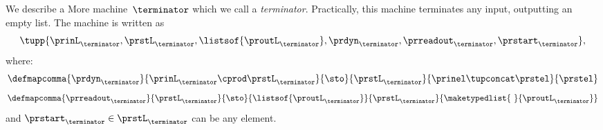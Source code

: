 \begin{example}[Terminator]
    We describe a More machine~$\terminator$ which we call a \emph{terminator}.
    Practically, this machine terminates any input, outputting an empty list.
    The machine is written as
    \begin{equation*}
        \tupp{\prinL_{\terminator},\prstL_{\terminator},\listsof{\proutL_{\terminator}},\prdyn_{\terminator},\prreadout_{\terminator},\prstart_{\terminator}},
    \end{equation*}
    where:
    \begin{equation*}
        \defmapcomma{\prdyn_\terminator}
        {\prinL_\terminator \cprod \prstL_\terminator}
        {\sto}
        {\prstL_\terminator}
        {\prinel \tupconcat \prstel}
        {\prstel}
    \end{equation*}
    \begin{equation*}
        \defmapcomma{\prreadout_\terminator}
        {\prstL_\terminator}
        {\sto}
        {\listsof{\proutL_\terminator}}
        {\prstL_\terminator}
        {
            \maketypedlist{ \ }{\proutL_\terminator}
        }
    \end{equation*}
    and $\prstart_\terminator \in \prstL_\terminator$ can be any element.
\end{example}
